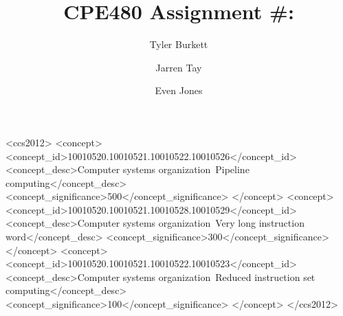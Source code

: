 \documentclass[sigconf]{acmart}
\begin{document}
%
\title{CPE480 Assignment \#: }

%
\author{Tyler Burkett}

\author{Jarren Tay}

\author{Even Jones}
%
\renewcommand{\shortauthors}{Burkett, Jones, Tay}

%
\begin{abstract}
\end{abstract}

%
%
  \begin{CCSXML}
<ccs2012>
<concept>
<concept_id>10010520.10010521.10010522.10010526</concept_id>
<concept_desc>Computer systems organization~Pipeline computing</concept_desc>
<concept_significance>500</concept_significance>
</concept>
<concept>
<concept_id>10010520.10010521.10010528.10010529</concept_id>
<concept_desc>Computer systems organization~Very long instruction word</concept_desc>
<concept_significance>300</concept_significance>
</concept>
<concept>
<concept_id>10010520.10010521.10010522.10010523</concept_id>
<concept_desc>Computer systems organization~Reduced instruction set computing</concept_desc>
<concept_significance>100</concept_significance>
</concept>
</ccs2012>
\end{CCSXML}
\end{document}
